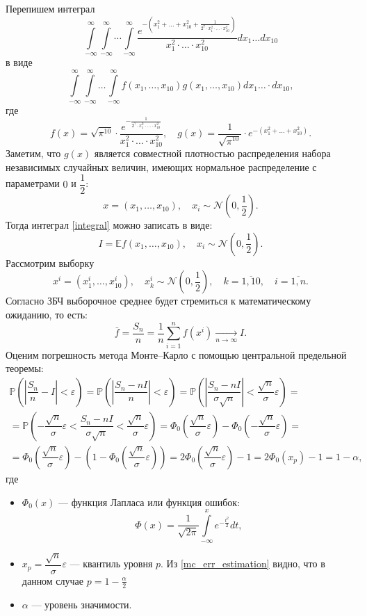 Перепишем интеграл
$$
\int\limits_{-\infty}^{\infty} \int\limits_{-\infty}^\infty \cdots
 \int\limits_{-\infty}^\infty \frac{e^{-\left(x_1^2 + \ldots + x_{10}^2 +
 \frac{1}{ 2^7\cdot x_1^2 \cdot \ldots \cdot x_{10}^2}\right)}}{x_1^2 \cdot
 \ldots \cdot x_{10}^2}dx_1\ldots dx_{10}
$$
в виде
$$
\int\limits_{-\infty}^{\infty} \int\limits_{-\infty}^{\infty} \ldots
 \int\limits_{-\infty}^{\infty} f(x_1,\ldots,x_{10})g(x_1,\ldots,x_{10}) dx_1
 \ldots\cdot dx_{10},
$$
где
$$
f(x) = \sqrt{\pi^{10}}\cdot \dfrac{e^{-\frac{1}{2^7\cdot x_1^2 \cdot \ldots
 \cdot x_{10}^2}}}{x_1^2\cdot \ldots \cdot x_{10}^2},\quad g(x) = \dfrac{1}
 {\sqrt{\pi^{10}}}\cdot e^{-(x_1^2+\ldots +x_{10}^2)}.
$$
Заметим, что $ g(x) $ является совместной плотностью распределения набора
 независимых случайных величин, имеющих нормальное распределение с параметрами
 $0$ и $\dfrac{1}{2}$:
$$
x=(x_1,\ldots,x_{10}),\quad x_i\sim\mathcal{N}\left(0,\dfrac{1}{2}\right).
$$
Тогда интеграл \eqref{integral} можно записать в виде:
$$
I = \mathbb{E} f(x_1,\ldots,x_{10}),\quad x_i\sim\mathcal{N}\left(0, 
 \dfrac{1}{2}\right).
$$
Рассмотрим выборку
$$
x^i = (x_1^i, \ldots, x_{10}^i),\quad x_k^i\sim\mathcal{N}\left(0,\dfrac{1}{2}
 \right),\quad k = \overline{1,10}, \quad i = \overline{1,n}.
$$
Согласно ЗБЧ выборочное среднее будет стремиться к математическому ожиданию,
 то есть:
$$
\bar{f} = \dfrac{S_n}{n} = \dfrac{1}{n} \sum_{i = 1}^n f(x^i) \xrightarrow
 [n\to\infty]{}I.
$$
Оценим погрешность метода Монте--Карло с помощью центральной предельной теоремы:
\begin{multline}\label{mc_err_estimation}
\mathbb{P} \left( \left| \dfrac{S_n}{n} - I \right| < \varepsilon \right) =
 \mathbb{P} \left( \left| \dfrac{S_n - nI}{n} \right| <\varepsilon \right) =
 \mathbb{P}\left(\left|\dfrac{S_n-nI}{\sigma\sqrt{n}}\right|<\dfrac{\sqrt{n}}
 {\sigma}\varepsilon\right) =\\
 = \mathbb{P}\left(-\dfrac{\sqrt{n}}{\sigma}\varepsilon<\dfrac{S_n-nI}
 {\sigma\sqrt{n}}<\dfrac{\sqrt{n}}{\sigma}\varepsilon\right) = \Phi_0 
 \left( \dfrac{\sqrt{n}}{\sigma}\varepsilon\right)-\Phi_0 \left( -\dfrac{\sqrt{n}}
 {\sigma} \varepsilon \right) =\\
 = \Phi_0 \left( \dfrac{\sqrt{n}}{\sigma} \varepsilon \right) - \left( 1 -
 \Phi_0 \left( \dfrac{\sqrt{n}}{\sigma} \varepsilon \right) \right) =
 2\Phi_0 \left( \dfrac{\sqrt{n}}{\sigma} \varepsilon \right)  - 1 = 2 \Phi_0(x_p) -
 1 = 1 - \alpha,
\end{multline}
где
\begin{itemize}
	\item $\Phi_0(x)$ --- функция Лапласа или функция ошибок:
	$$
	\Phi(x) = \dfrac{1}{\sqrt{2\pi}} \int\limits_{-\infty}^x e^{-\frac{t^2}{2}}dt,
	$$
	\item $x_p = \dfrac{\sqrt{n}}{\sigma} \varepsilon $ --- квантиль уровня
     $ p $. Из \eqref{mc_err_estimation} видно, что в данном случае 
     $ p = 1 - \frac{\alpha}{2} $
	\item $ \alpha $ --- уровень значимости.
\end{itemize}
